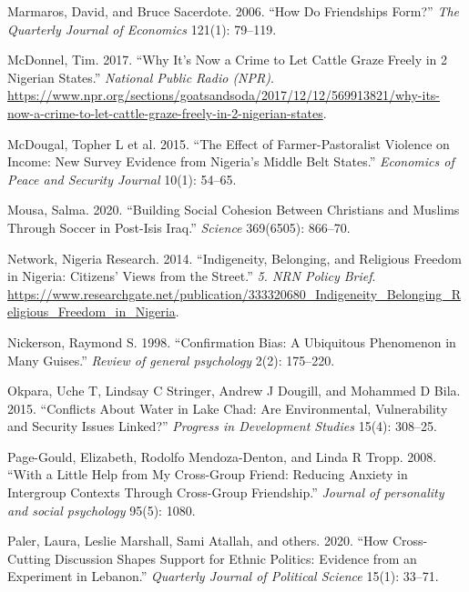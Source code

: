 \documentclass[11pt]{article}
\begin{document}
\begin{cslreferences}
\leavevmode\hypertarget{ref-marmaros2006friendships}{}%
Marmaros, David, and Bruce Sacerdote. 2006. ``How Do Friendships Form?''
\emph{The Quarterly Journal of Economics} 121(1): 79--119.

\leavevmode\hypertarget{ref-mcdonnel2017graze}{}%
McDonnel, Tim. 2017. ``Why It's Now a Crime to Let Cattle Graze Freely
in 2 Nigerian States.'' \emph{National Public Radio (NPR)}.
\url{https://www.npr.org/sections/goatsandsoda/2017/12/12/569913821/why-its-now-a-crime-to-let-cattle-graze-freely-in-2-nigerian-states}.

\leavevmode\hypertarget{ref-mcdougal2015effect}{}%
McDougal, Topher L et al. 2015. ``The Effect of Farmer-Pastoralist
Violence on Income: New Survey Evidence from Nigeria's Middle Belt
States.'' \emph{Economics of Peace and Security Journal} 10(1): 54--65.

\leavevmode\hypertarget{ref-mousa2020building}{}%
Mousa, Salma. 2020. ``Building Social Cohesion Between Christians and
Muslims Through Soccer in Post-Isis Iraq.'' \emph{Science} 369(6505):
866--70.

\leavevmode\hypertarget{ref-nigeria2014freedom}{}%
Network, Nigeria Research. 2014. ``Indigeneity, Belonging, and Religious
Freedom in Nigeria: Citizens' Views from the Street.'' \emph{5. NRN
Policy Brief}.
\url{https://www.researchgate.net/publication/333320680_Indigeneity_Belonging_Religious_Freedom_in_Nigeria}.

\leavevmode\hypertarget{ref-nickerson1998confirmation}{}%
Nickerson, Raymond S. 1998. ``Confirmation Bias: A Ubiquitous Phenomenon
in Many Guises.'' \emph{Review of general psychology} 2(2): 175--220.

\leavevmode\hypertarget{ref-okpara2015conflicts}{}%
Okpara, Uche T, Lindsay C Stringer, Andrew J Dougill, and Mohammed D
Bila. 2015. ``Conflicts About Water in Lake Chad: Are Environmental,
Vulnerability and Security Issues Linked?'' \emph{Progress in
Development Studies} 15(4): 308--25.

\leavevmode\hypertarget{ref-page2008little}{}%
Page-Gould, Elizabeth, Rodolfo Mendoza-Denton, and Linda R Tropp. 2008.
``With a Little Help from My Cross-Group Friend: Reducing Anxiety in
Intergroup Contexts Through Cross-Group Friendship.'' \emph{Journal of
personality and social psychology} 95(5): 1080.

\leavevmode\hypertarget{ref-paler2020cross}{}%
Paler, Laura, Leslie Marshall, Sami Atallah, and others. 2020. ``How
Cross-Cutting Discussion Shapes Support for Ethnic Politics: Evidence
from an Experiment in Lebanon.'' \emph{Quarterly Journal of Political
Science} 15(1): 33--71.


\end{cslreferences}
\end{document}
